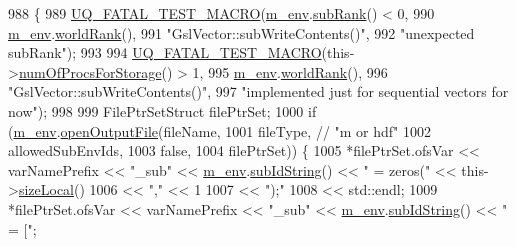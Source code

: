 \begin{DoxyCode}
988 \{
989   \hyperlink{_defines_8h_a56d63d18d0a6d45757de47fcc06f574d}{UQ\_FATAL\_TEST\_MACRO}(\hyperlink{class_q_u_e_s_o_1_1_vector_ae7615172bb1e54339151d3f3d71a0344}{m\_env}.\hyperlink{class_q_u_e_s_o_1_1_base_environment_a172d52f993f1322ed45aaddf71518dbb}{subRank}() < 0,
990                       \hyperlink{class_q_u_e_s_o_1_1_vector_ae7615172bb1e54339151d3f3d71a0344}{m\_env}.\hyperlink{class_q_u_e_s_o_1_1_base_environment_a78b57112bbd0e6dd0e8afec00b40ffa7}{worldRank}(),
991                       \textcolor{stringliteral}{"GslVector::subWriteContents()"},
992                       \textcolor{stringliteral}{"unexpected subRank"});
993 
994   \hyperlink{_defines_8h_a56d63d18d0a6d45757de47fcc06f574d}{UQ\_FATAL\_TEST\_MACRO}(this->\hyperlink{class_q_u_e_s_o_1_1_vector_a4dab068a8b5cedef00b8520c4e106a2b}{numOfProcsForStorage}() > 1,
995                       \hyperlink{class_q_u_e_s_o_1_1_vector_ae7615172bb1e54339151d3f3d71a0344}{m\_env}.\hyperlink{class_q_u_e_s_o_1_1_base_environment_a78b57112bbd0e6dd0e8afec00b40ffa7}{worldRank}(),
996                       \textcolor{stringliteral}{"GslVector::subWriteContents()"},
997                       \textcolor{stringliteral}{"implemented just for sequential vectors for now"});
998 
999   FilePtrSetStruct filePtrSet;
1000   \textcolor{keywordflow}{if} (\hyperlink{class_q_u_e_s_o_1_1_vector_ae7615172bb1e54339151d3f3d71a0344}{m\_env}.\hyperlink{class_q_u_e_s_o_1_1_base_environment_ab8fe853074f12ea34e18724119a2fc75}{openOutputFile}(fileName,
1001                            fileType, \textcolor{comment}{// "m or hdf"}
1002                            allowedSubEnvIds,
1003                            \textcolor{keyword}{false},
1004                            filePtrSet)) \{
1005     *filePtrSet.ofsVar << varNamePrefix << \textcolor{stringliteral}{"\_sub"} << \hyperlink{class_q_u_e_s_o_1_1_vector_ae7615172bb1e54339151d3f3d71a0344}{m\_env}.\hyperlink{class_q_u_e_s_o_1_1_base_environment_a73f7849acdd5d5ba15a3094fe18f258f}{subIdString}() << \textcolor{stringliteral}{" = zeros("} << 
      this->\hyperlink{class_q_u_e_s_o_1_1_gsl_vector_ace6fb1739b7cf6456b3dcde84c766fb3}{sizeLocal}()
1006                        << \textcolor{stringliteral}{","}                                                           << 1
1007                        << \textcolor{stringliteral}{");"}
1008                        << std::endl;
1009     *filePtrSet.ofsVar << varNamePrefix << \textcolor{stringliteral}{"\_sub"} << \hyperlink{class_q_u_e_s_o_1_1_vector_ae7615172bb1e54339151d3f3d71a0344}{m\_env}.\hyperlink{class_q_u_e_s_o_1_1_base_environment_a73f7849acdd5d5ba15a3094fe18f258f}{subIdString}() << \textcolor{stringliteral}{" = ["};

\end{DoxyCode}
